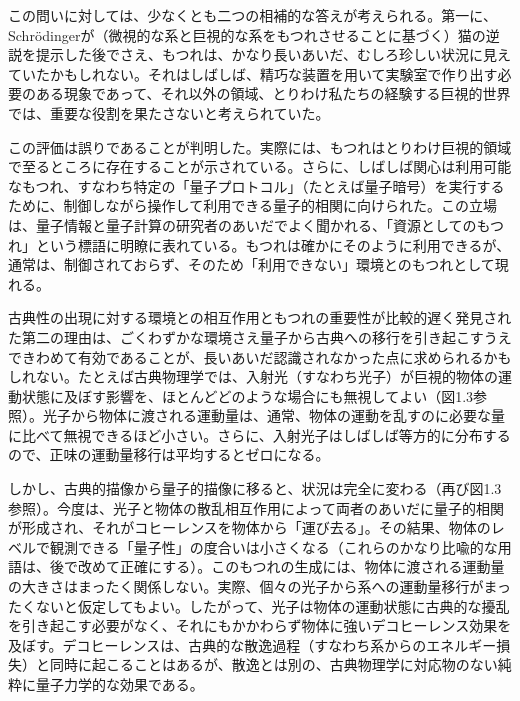 この問いに対しては、少なくとも二つの相補的な答えが考えられる。第一に、Schrödingerが（微視的な系と巨視的な系をもつれさせることに基づく）猫の逆説を提示した後でさえ、もつれは、かなり長いあいだ、むしろ珍しい状況に見えていたかもしれない。それはしばしば、精巧な装置を用いて実験室で作り出す必要のある現象であって、それ以外の領域、とりわけ私たちの経験する巨視的世界では、重要な役割を果たさないと考えられていた。

\hypertarget{srcpage:7}{}\label{srcpage:7}この評価は誤りであることが判明した。実際には、もつれはとりわけ巨視的領域で至るところに存在することが示されている。さらに、しばしば関心は利用可能なもつれ、すなわち特定の「量子プロトコル」（たとえば量子暗号）を実行するために、制御しながら操作して利用できる量子的相関に向けられた。この立場は、量子情報と量子計算の研究者のあいだでよく聞かれる、「資源としてのもつれ」という標語に明瞭に表れている。もつれは確かにそのように利用できるが、通常は、制御されておらず、そのため「利用できない」環境とのもつれとして現れる。

古典性の出現に対する環境との相互作用ともつれの重要性が比較的遅く発見された第二の理由は、ごくわずかな環境さえ量子から古典への移行を引き起こすうえできわめて有効であることが、長いあいだ認識されなかった点に求められるかもしれない。たとえば古典物理学では、入射光（すなわち光子）が巨視的物体の運動状態に及ぼす影響を、ほとんどどのような場合にも無視してよい（図1.3参照）。光子から物体に渡される運動量は、通常、物体の運動を乱すのに必要な量に比べて無視できるほど小さい。さらに、入射光子はしばしば等方的に分布するので、正味の運動量移行は平均するとゼロになる。

しかし、古典的描像から量子的描像に移ると、状況は完全に変わる（再び図1.3参照）。今度は、光子と物体の散乱相互作用によって両者のあいだに量子的相関が形成され、それがコヒーレンスを物体から「運び去る」。\hypertarget{srcpage:8}{}\label{srcpage:8}その結果、物体のレベルで観測できる「量子性」の度合いは小さくなる（これらのかなり比喩的な用語は、後で改めて正確にする）。このもつれの生成には、物体に渡される運動量の大きさはまったく関係しない。実際、個々の光子から系への運動量移行がまったくないと仮定してもよい。したがって、光子は物体の運動状態に古典的な擾乱を引き起こす必要がなく、それにもかかわらず物体に強いデコヒーレンス効果を及ぼす。デコヒーレンスは、古典的な散逸過程（すなわち系からのエネルギー損失）と同時に起こることはあるが、散逸とは別の、古典物理学に対応物のない純粋に量子力学的な効果である。

